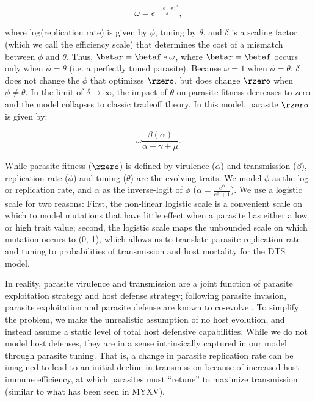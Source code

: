 \begin{equation}
\omega = e^{\frac{-(\phi - \theta)^2}{\delta}},
\end{equation}

\noindent where log(replication rate) is given by $\phi$, tuning by $\theta$, and $\delta$ is a scaling factor (which we call the efficiency scale) that determines the cost of a mismatch between $\phi$ and $\theta$. Thus, $\betar = \betaf * \omega$, where $\betar = \betaf$ occurs only when $\phi = \theta$ (i.e. a perfectly tuned parasite). Because $\omega = 1$ when $\phi = \theta$, $\delta$ does not change the $\phi$ that optimizes $\rzero$, but does change $\rzero$ when $\phi \neq \theta$. In the limit of $\delta \rightarrow \infty$, the impact of $\theta$ on parasite fitness decreases to zero and the model collapses to classic tradeoff theory. In this model, parasite $\rzero$ is given by:

\begin{equation}
\omega \frac{\beta(\alpha)}{\alpha + \gamma + \mu}.
\end{equation}

While parasite fitness ($\rzero$) is defined by virulence ($\alpha$) and transmission ($\beta$), replication rate ($\phi$) and tuning ($\theta$) are the evolving traits. We model $\phi$ as the log or replication rate, and $\alpha$ as the inverse-logit of $\phi$ ($\alpha = \frac{e^{\phi}}{e^{\phi} + 1}$). We use a logistic scale for two reasons: First, the non-linear logistic scale is a convenient scale on which to model mutations that have little effect when a parasite has either a low or high trait value; second, the logistic scale maps the unbounded scale on which mutation occurs to (0, 1), which allows us to translate parasite replication rate and tuning to probabilities of transmission and host mortality for the DTS model.

In reality, parasite virulence and transmission are a joint function of parasite exploitation strategy and host defense strategy; following parasite invasion, parasite exploitation and parasite defense are known to co-evolve \citep{FennerandMarshall1957, CarvalandFerriere2010, Bestetal.2014}. To simplify the problem, we make the unrealistic assumption of no host evolution, and instead assume a static level of total host defensive capabilities. While we do not model host defenses, they are in a sense intrinsically captured in our model through parasite tuning. That is, a change in parasite replication rate can be imagined to lead to an initial decline in transmission because of increased host immune efficiency, at which parasites must ``retune'' to maximize transmission (similar to what has been seen in MYXV).

